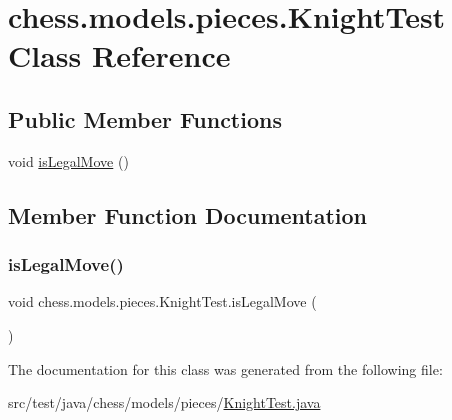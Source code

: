 \hypertarget{classchess_1_1models_1_1pieces_1_1_knight_test}{}\section{chess.\+models.\+pieces.\+Knight\+Test Class Reference}
\label{classchess_1_1models_1_1pieces_1_1_knight_test}
\subsection*{Public Member Functions}
\begin{DoxyCompactItemize}
\item 
void \mbox{\hyperlink{classchess_1_1models_1_1pieces_1_1_knight_test_a9d4b9c5b54db6a2cb8e161ac8bcf35eb}{is\+Legal\+Move}} ()
\end{DoxyCompactItemize}


\subsection{Member Function Documentation}
\mbox{\label{classchess_1_1models_1_1pieces_1_1_knight_test_a9d4b9c5b54db6a2cb8e161ac8bcf35eb}} 
\subsubsection{\texorpdfstring{is\+Legal\+Move()}{isLegalMove()}}
{\footnotesize\ttfamily void chess.\+models.\+pieces.\+Knight\+Test.\+is\+Legal\+Move (\begin{DoxyParamCaption}{ }\end{DoxyParamCaption})}



The documentation for this class was generated from the following file\+:\begin{DoxyCompactItemize}
\item 
src/test/java/chess/models/pieces/\mbox{\hyperlink{_knight_test_8java}{Knight\+Test.\+java}}\end{DoxyCompactItemize}
